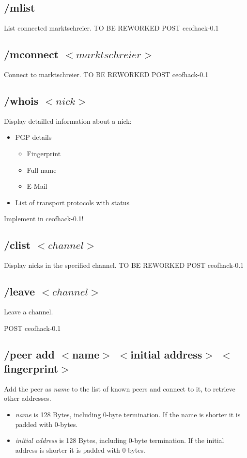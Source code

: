 \documentclass[12pt,a4paper]{book}
\begin{document}
\subsection{/mlist}
List connected marktschreier.
TO BE REWORKED
POST ceofhack-0.1

\subsection{/mconnect $<marktschreier>$}
Connect to marktschreier.
TO BE REWORKED
POST ceofhack-0.1

\subsection{/whois $<nick>$}
Display detailled information about a nick:
\begin{itemize}
\item PGP details
\begin{itemize}
\item Fingerprint
\item Full name
\item E-Mail
\end{itemize}
\item List of transport protocols with status
\end{itemize}

Implement in ceofhack-0.1!
\subsection{/clist $<channel>$}
Display nicks in the specified channel.
TO BE REWORKED
POST ceofhack-0.1

\subsection{/leave $<channel>$}
Leave a channel.

POST ceofhack-0.1


\subsection{/peer add $<$name$>$ $<$initial address$>$ $<$fingerprint$>$}
Add the peer as \textit{name} to the list of known peers
and connect to it, to retrieve other addresses.
\begin{itemize}
\item \textit{name} is 128 Bytes, including 0-byte termination.
If the name is shorter it is padded with 0-bytes.
\item \textit{initial address} is 128 Bytes, including 0-byte termination.
If the initial address is shorter it is padded with 0-bytes.
\end{itemize}
\end{document}
